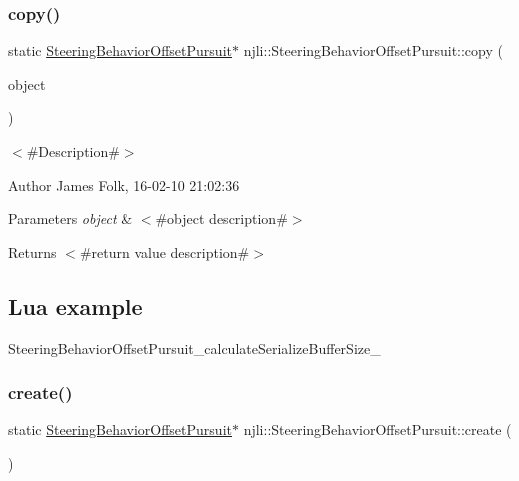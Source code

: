 \subsubsection{\texorpdfstring{copy()}{copy()}}
{\footnotesize\ttfamily static \mbox{\hyperlink{classnjli_1_1_steering_behavior_offset_pursuit}{Steering\+Behavior\+Offset\+Pursuit}}$\ast$ njli\+::\+Steering\+Behavior\+Offset\+Pursuit\+::copy (\begin{DoxyParamCaption}\item[{const \mbox{\hyperlink{classnjli_1_1_steering_behavior_offset_pursuit}{Steering\+Behavior\+Offset\+Pursuit}} \&}]{object }\end{DoxyParamCaption})\hspace{0.3cm}{\ttfamily [static]}}



$<$\#\+Description\#$>$ 

\begin{DoxyAuthor}{Author}
James Folk, 16-\/02-\/10 21\+:02\+:36
\end{DoxyAuthor}

\begin{DoxyParams}{Parameters}
{\em object} & $<$\#object description\#$>$\\
\hline
\end{DoxyParams}
\begin{DoxyReturn}{Returns}
$<$\#return value description\#$>$
\end{DoxyReturn}
\hypertarget{classnjli_1_1_steering_behavior_wander_ex1}{}\subsection{Lua example}\label{classnjli_1_1_steering_behavior_wander_ex1}

\begin{DoxyCodeInclude}
\end{DoxyCodeInclude}
Steering\+Behavior\+Offset\+Pursuit\+\_\+calculate\+Serialize\+Buffer\+Size\+\_\+ \mbox{\label{classnjli_1_1_steering_behavior_offset_pursuit_a90ed1a4648b504840f9666c35c83f7af}} 
\subsubsection{\texorpdfstring{create()}{create()}\hspace{0.1cm}{\footnotesize\ttfamily [1/2]}}
{\footnotesize\ttfamily static \mbox{\hyperlink{classnjli_1_1_steering_behavior_offset_pursuit}{Steering\+Behavior\+Offset\+Pursuit}}$\ast$ njli\+::\+Steering\+Behavior\+Offset\+Pursuit\+::create (\begin{DoxyParamCaption}{ }\end{DoxyParamCaption})\hspace{0.3cm}{\ttfamily [static]}}



